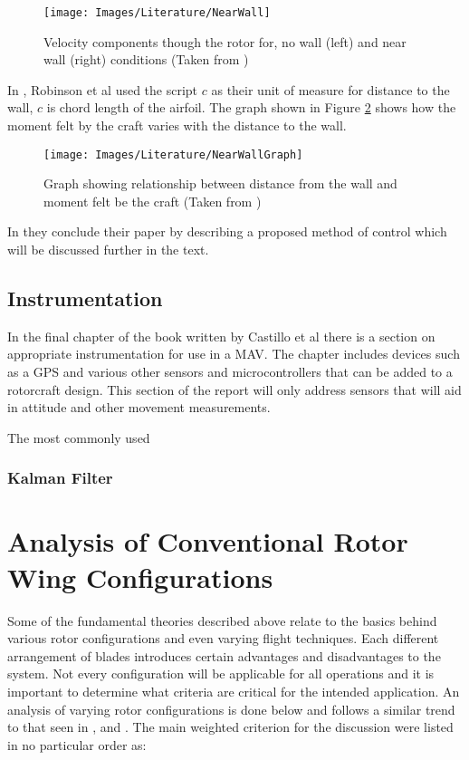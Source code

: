 \begin{figure}[H]
	\centering
	\texttt{[image: Images/Literature/NearWall]}     
	\caption{Velocity components though the rotor for, no wall (left) and near wall (right) conditions (Taken from \cite{NearWall})}
	\label{IM_NearWall}
\end{figure}

In \cite{NearWall}, Robinson et al used the script $c$ as their unit of measure for distance to the wall, $c$ is chord length of the airfoil. The graph shown in Figure \ref{IM_NearWallGraph} shows how the moment felt by the craft varies with the distance to the wall.

\begin{figure}[H]
	\centering
	\texttt{[image: Images/Literature/NearWallGraph]}     
	\caption{Graph showing relationship between distance from the wall and moment felt be the craft (Taken from \cite{NearWall})}
	\label{IM_NearWallGraph}
\end{figure}

In \cite{NearWall} they conclude their paper by describing a proposed method of control which will be discussed further in the text.

\subsection{Instrumentation}
In the final chapter of the book written by Castillo et al \cite{MiniFlying} there is a section on appropriate instrumentation for use in a MAV. The chapter includes devices such as a GPS and various other sensors and microcontrollers that can be added to a rotorcraft design. This section of the report will only address sensors that will aid in attitude and other movement measurements.

The most commonly used
\subsubsection{Kalman Filter}

\section{Analysis of Conventional Rotor Wing Configurations}

Some of the fundamental theories described above relate to the basics behind various rotor configurations and even varying flight techniques. Each different arrangement of blades introduces certain advantages and disadvantages to the system. Not every configuration will be applicable for all operations and it is important to determine what criteria are critical for the intended application.  An analysis of varying rotor configurations is done below and follows a similar trend to that seen in \cite{RotorConfig}, \cite{Bohorquez} and \cite{NewMAV}. The main weighted criterion for the discussion were listed in no particular order as:


